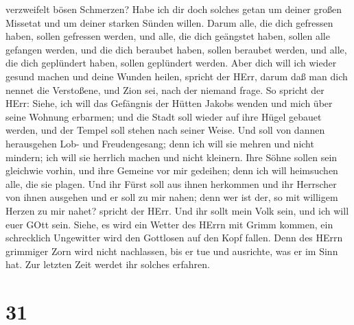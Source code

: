 verzweifelt bösen Schmerzen? Habe ich dir doch solches getan um deiner
großen Missetat und um deiner starken Sünden willen.  Darum
alle, die dich gefressen haben, sollen gefressen werden, und alle, die
dich geängstet haben, sollen alle gefangen werden, und die dich beraubet
haben, sollen beraubet werden, und alle, die dich geplündert haben,
sollen geplündert werden.  Aber dich will ich wieder gesund
machen und deine Wunden heilen, spricht der HErr, darum daß man dich
nennet die Verstoßene, und Zion sei, nach der niemand frage.
 So spricht der HErr: Siehe, ich will das Gefängnis der
Hütten Jakobs wenden und mich über seine Wohnung erbarmen; und die Stadt
soll wieder auf ihre Hügel gebauet werden, und der Tempel soll stehen
nach seiner Weise.  Und soll von dannen herausgehen Lob-
und Freudengesang; denn ich will sie mehren und nicht mindern; ich will
sie herrlich machen und nicht kleinern.  Ihre Söhne sollen
sein gleichwie vorhin, und ihre Gemeine vor mir gedeihen; denn ich will
heimsuchen alle, die sie plagen.  Und ihr Fürst soll aus
ihnen herkommen und ihr Herrscher von ihnen ausgehen und er soll zu mir
nahen; denn wer ist der, so mit willigem Herzen zu mir nahet? spricht
der HErr.  Und ihr sollt mein Volk sein, und ich will euer
GOtt sein.  Siehe, es wird ein Wetter des HErrn mit Grimm
kommen, ein schrecklich Ungewitter wird den Gottlosen auf den Kopf
fallen.  Denn des HErrn grimmiger Zorn wird nicht
nachlassen, bis er tue und ausrichte, was er im Sinn hat. Zur letzten
Zeit werdet ihr solches erfahren.

\hypertarget{section-30}{%
\section{31}\label{section-30}}

